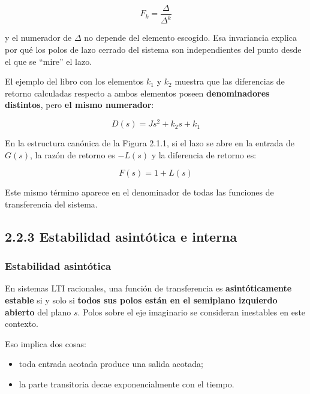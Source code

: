 \[
F_k=\frac{\Delta}{\Delta^k} \tag{2.2.6}
\]

y el numerador de \(\Delta\) no depende del elemento escogido. Esa invariancia explica por qué los polos de lazo cerrado del sistema son independientes del punto desde el que se “mire” el lazo.


El ejemplo del libro con los elementos \(k_1\) y \(k_2\) muestra que las diferencias de retorno calculadas respecto a ambos elementos poseen \textbf{denominadores distintos}, pero \textbf{el mismo numerador}:

$$
D(s)=Js^2+k_2s+k_1
$$


En la estructura canónica de la Figura 2.1.1, si el lazo se abre en la entrada de \(G(s)\), la razón de retorno es \(-L(s)\) y la diferencia de retorno es:

$$
F(s)=1+L(s)
$$

Este mismo término aparece en el denominador de todas las funciones de transferencia del sistema.

\subsection{2.2.3 Estabilidad asintótica e interna}

\subsubsection{Estabilidad asintótica}
En sistemas LTI racionales, una función de transferencia es \textbf{asintóticamente estable} si y solo si \textbf{todos sus polos están en el semiplano izquierdo abierto} del plano \(s\). Polos sobre el eje imaginario se consideran inestables en este contexto.

Eso implica dos cosas:

\begin{itemize}
  \item toda entrada acotada produce una salida acotada;
  \item la parte transitoria decae exponencialmente con el tiempo.
\end{itemize}

